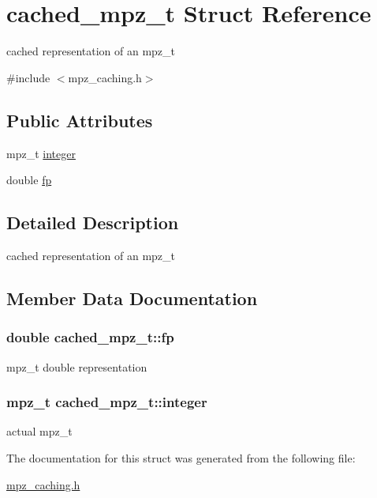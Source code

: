 \hypertarget{structcached__mpz__t}{}\section{cached\+\_\+mpz\+\_\+t Struct Reference}
\label{structcached__mpz__t}


cached representation of an mpz\+\_\+t  




{\ttfamily \#include $<$mpz\+\_\+caching.\+h$>$}

\subsection*{Public Attributes}
\begin{DoxyCompactItemize}
\item 
mpz\+\_\+t \hyperlink{structcached__mpz__t_ac583570461b183678dd9223ecf0a8cfd}{integer}
\item 
double \hyperlink{structcached__mpz__t_a60b47a7eec98eaa5f98316e5fe1c9724}{fp}
\end{DoxyCompactItemize}


\subsection{Detailed Description}
cached representation of an mpz\+\_\+t 

\subsection{Member Data Documentation}
\subsubsection[{\texorpdfstring{fp}{fp}}]{\setlength{\rightskip}{0pt plus 5cm}double cached\+\_\+mpz\+\_\+t\+::fp}\hypertarget{structcached__mpz__t_a60b47a7eec98eaa5f98316e5fe1c9724}{}\label{structcached__mpz__t_a60b47a7eec98eaa5f98316e5fe1c9724}
mpz\+\_\+t double representation 
\subsubsection[{\texorpdfstring{integer}{integer}}]{\setlength{\rightskip}{0pt plus 5cm}mpz\+\_\+t cached\+\_\+mpz\+\_\+t\+::integer}\hypertarget{structcached__mpz__t_ac583570461b183678dd9223ecf0a8cfd}{}\label{structcached__mpz__t_ac583570461b183678dd9223ecf0a8cfd}
actual mpz\+\_\+t 

The documentation for this struct was generated from the following file\+:\begin{DoxyCompactItemize}
\item 
\hyperlink{mpz__caching_8h}{mpz\+\_\+caching.\+h}\end{DoxyCompactItemize}
